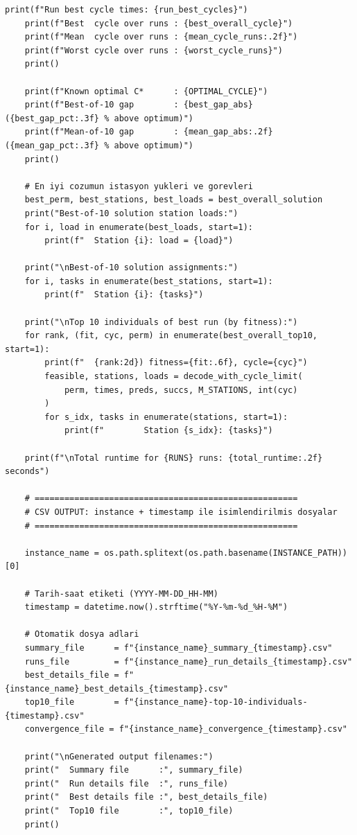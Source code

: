 \documentclass[12pt,a4paper]{article}
\begin{document}
\begin{lstlisting}[style=atomone,
caption={Python implementation of the genetic algorithm for the U-shaped assembly line balancing problem (UALBP-II) on the ARC83 instance.},
label={lst:ga-arc83-full}]
    print(f"Run best cycle times: {run_best_cycles}")
    print(f"Best  cycle over runs : {best_overall_cycle}")
    print(f"Mean  cycle over runs : {mean_cycle_runs:.2f}")
    print(f"Worst cycle over runs : {worst_cycle_runs}")
    print()

    print(f"Known optimal C*      : {OPTIMAL_CYCLE}")
    print(f"Best-of-10 gap        : {best_gap_abs}  ({best_gap_pct:.3f} % above optimum)")
    print(f"Mean-of-10 gap        : {mean_gap_abs:.2f}  ({mean_gap_pct:.3f} % above optimum)")
    print()

    # En iyi cozumun istasyon yukleri ve gorevleri
    best_perm, best_stations, best_loads = best_overall_solution
    print("Best-of-10 solution station loads:")
    for i, load in enumerate(best_loads, start=1):
        print(f"  Station {i}: load = {load}")

    print("\nBest-of-10 solution assignments:")
    for i, tasks in enumerate(best_stations, start=1):
        print(f"  Station {i}: {tasks}")

    print("\nTop 10 individuals of best run (by fitness):")
    for rank, (fit, cyc, perm) in enumerate(best_overall_top10, start=1):
        print(f"  {rank:2d}) fitness={fit:.6f}, cycle={cyc}")
        feasible, stations, loads = decode_with_cycle_limit(
            perm, times, preds, succs, M_STATIONS, int(cyc)
        )
        for s_idx, tasks in enumerate(stations, start=1):
            print(f"        Station {s_idx}: {tasks}")

    print(f"\nTotal runtime for {RUNS} runs: {total_runtime:.2f} seconds")

    # =====================================================
    # CSV OUTPUT: instance + timestamp ile isimlendirilmis dosyalar
    # =====================================================

    instance_name = os.path.splitext(os.path.basename(INSTANCE_PATH))[0]

    # Tarih-saat etiketi (YYYY-MM-DD_HH-MM)
    timestamp = datetime.now().strftime("%Y-%m-%d_%H-%M")

    # Otomatik dosya adlari
    summary_file      = f"{instance_name}_summary_{timestamp}.csv"
    runs_file         = f"{instance_name}_run_details_{timestamp}.csv"
    best_details_file = f"{instance_name}_best_details_{timestamp}.csv"
    top10_file        = f"{instance_name}-top-10-individuals-{timestamp}.csv"
    convergence_file = f"{instance_name}_convergence_{timestamp}.csv"

    print("\nGenerated output filenames:")
    print("  Summary file      :", summary_file)
    print("  Run details file  :", runs_file)
    print("  Best details file :", best_details_file)
    print("  Top10 file        :", top10_file)
    print()


\end{lstlisting}
\end{document}
